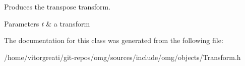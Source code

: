 Produces the transpose transform. 


\begin{DoxyParams}{Parameters}
{\em t} & a transform \\
\hline
\end{DoxyParams}


The documentation for this class was generated from the following file\+:\begin{DoxyCompactItemize}
\item 
/home/vitorgreati/git-\/repos/omg/sources/include/omg/objects/Transform.\+h\end{DoxyCompactItemize}
